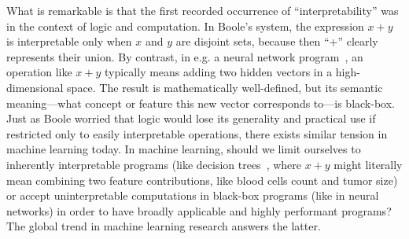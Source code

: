 What is remarkable is that the first recorded occurrence of ``interpretability'' was in the context of logic and computation. 
In Boole's system, the expression $x+y$ is interpretable only when $x$ and $y$ are disjoint sets, because then ``+'' clearly represents their union. 
By contrast, in e.g. a neural network program~\cite{perceptron}, an operation like $x+y$ typically means adding two hidden vectors in a high-dimensional space. 
The result is mathematically well-defined, but its semantic meaning—what concept or feature this new vector corresponds to—is black-box. 
Just as Boole worried that logic would lose its generality and practical use if restricted only to easily interpretable operations, there exists similar tension in machine learning today.
In machine learning, should we limit ourselves to inherently interpretable programs (like decision trees~\cite{breiman1984classification}, where $x+y$ might literally mean combining two feature contributions, like blood cells count and tumor size) or accept uninterpretable computations in black-box programs (like in neural networks) in order to have broadly applicable and highly performant programs?
The global trend in machine learning research answers the latter.

